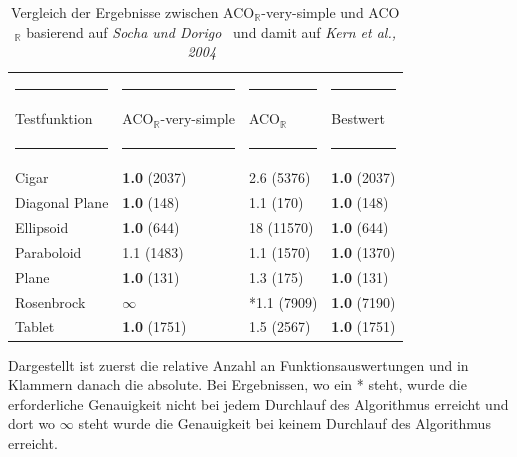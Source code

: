 \documentclass[fontsize=12, a4aper]{scrartcl}
\begin{document}
	\begin{table}[H]
		
		\fontsize{10pt}{12pt}
		
		\caption{Vergleich der Ergebnisse zwischen ACO\(_{\mathbb{R}}\)-very-simple und ACO\(_{\mathbb{R}}\) basierend auf \textit{Socha und Dorigo}~\cite{socha2008ant} und damit auf \textit{Kern et al., 2004}~\cite{kern2004learning}}
		
		\label{VerglelichACORundACORVerySimple}
		
		\begin{tabularx}{\textwidth}{l|l|l|l}
			
			\rule{3,45cm}{0.4pt} & \rule{3,45cm}{0.4pt} & \rule{3,45cm}{0.4pt} & \rule{3,45cm}{0.4pt}\\
			
			Testfunktion & ACO\(_{\mathbb{R}}\)-very-simple & ACO\(_{\mathbb{R}}\) & Bestwert\\
			
			\rule{3,45cm}{0.4pt} & \rule{3,45cm}{0.4pt} & \rule{3,45cm}{0.4pt} & \rule{3,45cm}{0.4pt}\\
			
			Cigar & \textbf{1.0} (2037) & 2.6 (5376) & \textbf{1.0} (2037)\\
			
			Diagonal Plane & \textbf{1.0} (148) & 1.1 (170) & \textbf{1.0} (148)\\
			
			Ellipsoid & \textbf{1.0} (644) & 18 (11570) & \textbf{1.0} (644)\\
			
			Paraboloid & 1.1 (1483) & 1.1 (1570) & \textbf{1.0} (1370)\\
			
			Plane & \textbf{1.0} (131) & 1.3 (175) & \textbf{1.0} (131)\\
			
			Rosenbrock & \(\infty\) & *1.1 (7909) & \textbf{1.0} (7190)\\
			
			Tablet & \textbf{1.0} (1751) & 1.5 (2567) & \textbf{1.0} (1751)
			
		\end{tabularx}
		
		\smallskip
		
		Dargestellt ist zuerst die relative Anzahl an Funktionsauswertungen und in Klammern danach die absolute. Bei Ergebnissen, wo ein * steht, wurde die erforderliche Genauigkeit nicht bei jedem Durchlauf des Algorithmus erreicht und dort wo \(\infty\) steht wurde die Genauigkeit bei keinem Durchlauf des Algorithmus erreicht.\hfill\newline
		
	\end{table}
	
\end{document}
